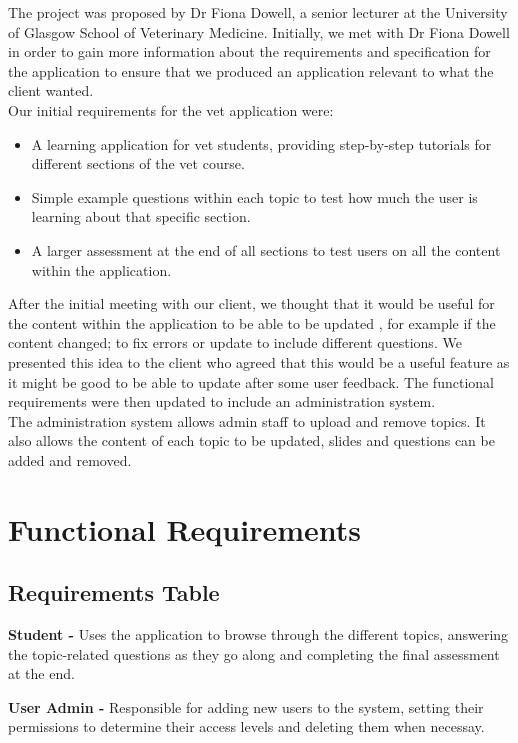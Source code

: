 \documentclass{l3proj}
\begin{document}
The project was proposed by Dr Fiona Dowell, a senior lecturer at the University of Glasgow School of Veterinary Medicine. Initially, we met with Dr Fiona Dowell in order to gain more information about the requirements and specification for the application to ensure that we produced an application relevant to what the client wanted.\\

Our initial requirements for the vet application were:

\begin{itemize}
\item A learning application for vet students, providing step-by-step tutorials for different sections of the vet course.
\item Simple example questions within each topic to test how much the user is learning about that specific section.
\item A larger assessment at the end of all sections to test users on all the content within the application.
\end{itemize}

After the initial meeting with our client, we thought that it would be useful for the content within the application to be able to be updated , for example if the content changed; to fix errors or update to include different questions. We presented this idea to the client who agreed that this would be a useful feature as it might be good to be able to update after some user feedback. The functional requirements were then updated to include an administration system.\\
The administration system allows admin staff to upload and remove topics. It also allows the content of each topic to be updated, slides and questions can be added and removed.


\section{Functional Requirements}

\subsection{Requirements Table}

\textbf{Student -} Uses the application to browse through the different topics, answering the topic-related questions as they go along and completing the final assessment at the end.

\textbf{User Admin -} Responsible for adding new users to the system, setting their permissions to determine their access levels and deleting them when necessay.
\end{document}
